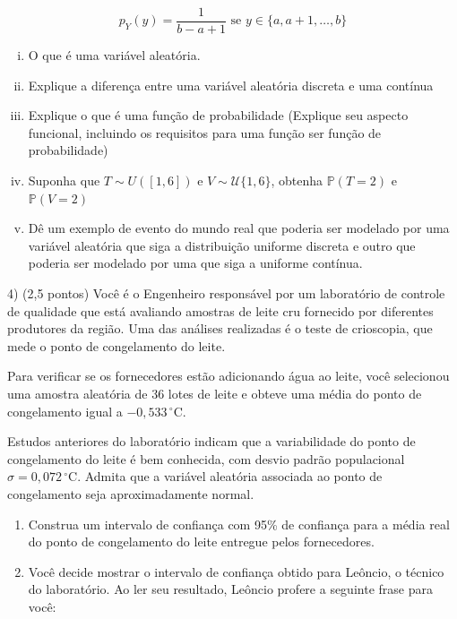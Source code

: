 \documentclass[12pt]{article}
\begin{document}
\begin{enumerate}[a)]
\begin{enumerate}[a)]
    $$p_{Y}(y) = \dfrac{1}{b-a+1}  \text{ se } y \in \{a, a+1, \dots, b\}$$

    \begin{enumerate}[i)]
        \item O que é uma variável aleatória. 
        \item Explique a diferença entre uma variável aleatória discreta e uma contínua
        \item Explique o que é uma função de probabilidade (Explique seu aspecto funcional, incluindo os requisitos para uma função ser função de probabilidade)
        \item Suponha que $T \sim U([1,6])$ e  $V \sim \mathcal{U}\{1,6\}$, obtenha $\mathds{P}(T=2)$ e $\mathds{P}(V=2)$
        \item Dê um exemplo de evento do mundo real que poderia ser modelado por uma variável aleatória que siga a distribuição uniforme discreta e outro que poderia ser modelado por uma que siga a uniforme contínua.
    \end{enumerate}
\end{enumerate}

\vspace{5px}
4) (2,5 pontos) Você é o Engenheiro responsável por um laboratório de controle de qualidade que está avaliando amostras de leite cru fornecido por diferentes
 produtores da região. Uma das análises realizadas é o teste de crioscopia, que mede o ponto de congelamento do leite. 

Para verificar se os fornecedores estão adicionando água ao leite, você selecionou uma amostra aleatória de 36 lotes de leite e obteve uma média do ponto de 
congelamento igual a \( -0{,}533\,^\circ\mathrm{C} \).

Estudos anteriores do laboratório indicam que a variabilidade do ponto de congelamento do leite é bem conhecida, com desvio padrão populacional  $\sigma = 0{,}072\,^\circ\mathrm{C}$.
Admita que a variável aleatória associada ao ponto de congelamento seja aproximadamente normal.

\begin{enumerate}
    \item Construa um intervalo de confiança com 95\% de confiança para a média real do ponto de congelamento do leite entregue pelos fornecedores.

    \item Você decide mostrar o intervalo de confiança obtido para Leôncio, o técnico do laboratório. Ao ler seu resultado, Leôncio profere a seguinte frase para você:
    

\end{enumerate}
\end{enumerate}
\end{document}
